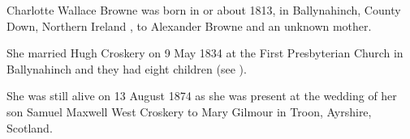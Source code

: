 
Charlotte Wallace Browne was born in or about 1813, in Ballynahinch, County Down, Northern Ireland \cite{CharlotteWBrowneBirth}, to Alexander Browne and an unknown mother.

She married Hugh Croskery on 9 May 1834 at the First Presbyterian Church in Ballynahinch and they had eight children (see ).

She was still alive on 13 August 1874 as she was present at the wedding of her son Samuel Maxwell West Croskery to Mary Gilmour in Troon, Ayrshire, Scotland. \cite{SMWCmarriage}
